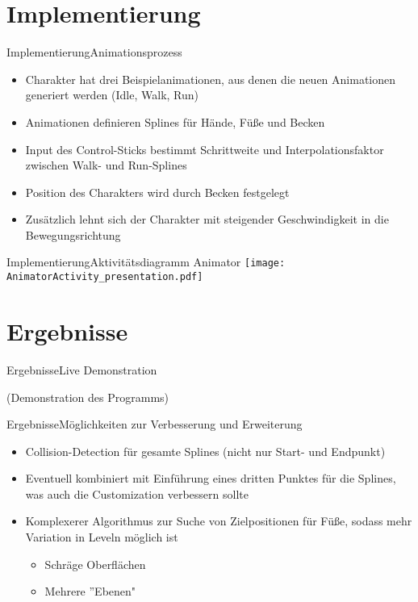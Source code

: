 \documentclass[t,aspectratio=169,divpsnames]{beamer}
\begin{document}
\section{Implementierung}
\begin{frame}{Implementierung}{Animationsprozess}
    \begin{itemize}
        \item Charakter hat drei Beispielanimationen, aus denen die neuen Animationen generiert werden (Idle, Walk, Run)
        \item Animationen definieren Splines für Hände, Füße und Becken
        \item Input des Control-Sticks bestimmt Schrittweite und Interpolationsfaktor zwischen Walk- und Run-Splines
        \item Position des Charakters wird durch Becken festgelegt
        \item Zusätzlich lehnt sich der Charakter mit steigender Geschwindigkeit in die Bewegungsrichtung
    \end{itemize}
\end{frame}

\begin{frame}{Implementierung}{Aktivitätsdiagramm Animator}
    \texttt{[image: AnimatorActivity\_presentation.pdf]}
\end{frame}


\section{Ergebnisse}
\begin{frame}{Ergebnisse}{Live Demonstration}
    \begin{center}
        \huge{(Demonstration des Programms)}
    \end{center}
\end{frame}

\begin{frame}{Ergebnisse}{Möglichkeiten zur Verbesserung und Erweiterung}
    \begin{itemize}
        \item Collision-Detection für gesamte Splines (nicht nur Start- und Endpunkt)
        \item Eventuell kombiniert mit Einführung eines dritten Punktes für die Splines, was auch die Customization verbessern sollte
        \item Komplexerer Algorithmus zur Suche von Zielpositionen für Füße, sodass mehr Variation in Leveln möglich ist
              \begin{itemize}
                  \item Schräge Oberflächen
                  \item Mehrere ''Ebenen"
              \end{itemize}
    \end{itemize}
\end{frame}
\end{document}
